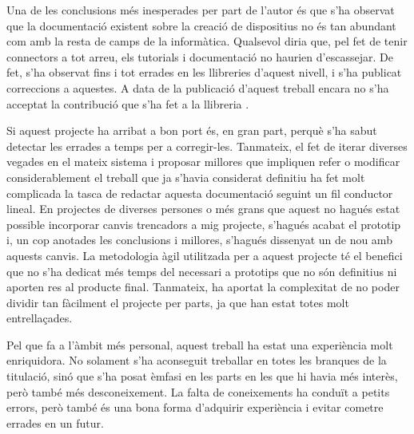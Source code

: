 Una de les conclusions més inesperades per part de l'autor és que s'ha
observat que la documentació existent sobre la creació de dispositius
 no és tan abundant com amb la resta de camps de la informàtica.
Qualsevol diria que, pel fet de tenir connectors  a tot arreu,
els tutorials i documentació no haurien d'escassejar. De
fet, s'ha observat fins i tot errades en les llibreries d'aquest nivell, i s'ha
publicat correccions a aquestes. A data de la publicació d'aquest treball encara
no s'ha acceptat la contribució que s'ha fet a la llibreria .

Si aquest projecte ha arribat a bon port és, en gran part, perquè s'ha sabut
detectar les errades a temps per a corregir-les. Tanmateix, el fet de iterar
diverses vegades en el mateix sistema i proposar millores que
impliquen refer o modificar considerablement el treball que ja s'havia
considerat definitiu ha fet molt complicada la tasca de redactar aquesta
documentació seguint un fil conductor lineal. En projectes de diverses persones
o més grans que aquest no hagués estat possible incorporar canvis trencadors
a mig projecte, s'hagués acabat el prototip i, un cop anotades les conclusions
i millores, s'hagués dissenyat un de nou amb aquests canvis. La metodologia
àgil utilitzada per a aquest projecte té el benefici que no s'ha dedicat més
temps del necessari a prototips que no són definitius ni aporten res al
producte final. Tanmateix, ha aportat la complexitat de no poder dividir tan
fàcilment el projecte per parts, ja que han estat totes molt entrellaçades.

Pel que fa a l'àmbit més personal, aquest treball ha estat una experiència molt
enriquidora. No solament s'ha aconseguit treballar en totes les branques de la
titulació, sinó que s'ha posat èmfasi en les parts en les que hi havia més
interès, però també més desconeixement. La falta de coneixements ha conduït a
petits errors, però també és una bona forma d'adquirir experiència i evitar
cometre errades en un futur.
